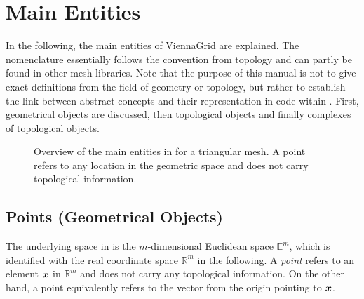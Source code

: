\chapter{Main Entities} \label{chap:entities}

In the following, the main entities of ViennaGrid are explained.
The nomenclature essentially follows the convention from topology and can partly be found in other mesh libraries.
Note that the purpose of this manual is not to give exact definitions from the field of geometry or topology, but rather to establish the link between abstract concepts and their representation in code within {\ViennaGrid}.
First, geometrical objects are discussed, then topological objects and finally complexes of topological objects.

\begin{figure}[tb]
\centering
 \caption{Overview of the main entities in {\ViennaGrid} for a triangular mesh. A point refers to any location in the geometric space and does not carry topological information.}
 \label{fig:entities}
\end{figure}


\section{Points (Geometrical Objects)}
The underlying space in {\ViennaGrid} is the $m$-dimensional Euclidean space $\mathbb{E}^m$, which is identified with the real coordinate space $\mathbb{R}^m$ in the following.
A \emph{point} refers to an element $\boldsymbol{x}$ in $\mathbb{R}^m$ and does not carry any topological information.
On the other hand, a point equivalently refers to the vector from the origin pointing to $\boldsymbol{x}$.

